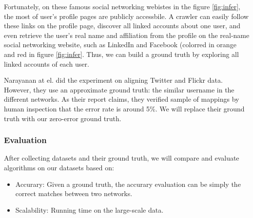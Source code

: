 \documentclass[11pt,letterpaper]{article}
\begin{document}
\begin{itemize}
Fortunately, on these famous social networking webistes in the figure \ref{fig:infer}, the most of user's profile pages are publicly accessbile. A crawler can easily follow these links on the profile page, discover all linked accounts about one user, and even retrieve the user's real name and affiliation from the profile on the real-name social networking website, such as LinkedIn and Facebook (colorred in orange and red in figure \ref{fig:infer}. Thus, we can build a ground truth by exploring all linked accounts of each user. 

\end{itemize}


Narayanan at el. \cite{Narayanan2008} did the experiment on aligning Twitter and Flickr data. However, they use an approximate ground truth: the similar username in the different networks. As their report claims, they  verified sample of mappings by human inspection that the error rate is around 5\%. We will replace their ground truth with our zero-error ground truth.

\subsubsection{Evaluation}
After collecting datasets and their ground truth, we will compare and evaluate algorithms on our datasets based on:
\begin{itemize}
\item
Accurary: Given a ground truth, the accurary evaluation can be simply the correct matches between two networks. 
\item
Scalability: Running time on the large-scale data.
\end{itemize}
\end{document}
